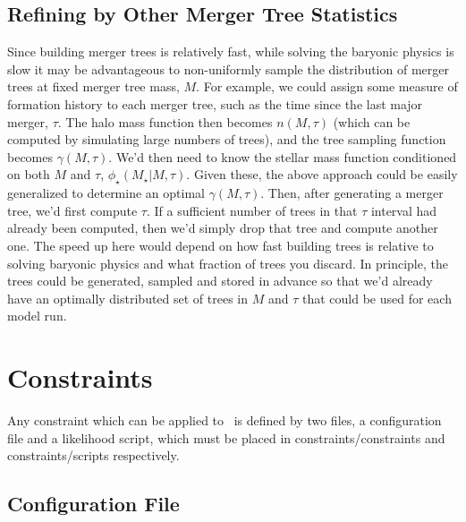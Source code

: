 \subsection{Refining by Other Merger Tree Statistics}

Since building merger trees is relatively fast, while solving the baryonic physics is slow it may be advantageous to  non-uniformly sample the distribution of merger trees at fixed merger tree mass, $M$. For example, we could assign some measure of formation history to each merger tree, such as the time since the last major merger, $\tau$. The halo mass function then becomes $n(M,\tau)$ (which can be computed by simulating large numbers of trees), and the tree sampling function becomes $\gamma(M,\tau)$. We'd then need to know the stellar mass function conditioned on both $M$ and $\tau$, $\phi_\star(M_\star|M,\tau)$. Given these, the above approach could be easily generalized to determine an optimal $\gamma(M,\tau)$. Then, after generating a merger tree, we'd first compute $\tau$. If a sufficient number of trees in that $\tau$ interval had already been computed, then we'd simply drop that tree and compute another one. The speed up here would depend on how fast building trees is relative to solving baryonic physics and what fraction of trees you discard. In principle, the trees could be generated, sampled and stored in advance so that we'd already have an optimally distributed set of trees in $M$ and $\tau$ that could be used for each model run.

\section{Constraints}\label{sec:ConstraintScripts}

Any constraint which can be applied to \glc\ is defined by two files, a configuration file and a likelihood script, which must be placed in {\normalfont \ttfamily constraints/constraints} and {\normalfont \ttfamily constraints/scripts} respectively. 

\subsection{Configuration File}\label{sec:ConstraintConfigFiles}


